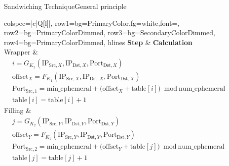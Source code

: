 \documentclass[aspectratio=169, hyperref={colorlinks=true, allcolors=SecondaryColor}, c]{beamer}
\begin{document}
	\begin{frame}[fragile]{Sandwiching Technique}{General principle}
		\begin{center}
			\begin{adjustbox}{max height=0.8\textheight, max width=0.8\textwidth}
				\begin{tblr}{
					colspec={|c|Q[l]|},
					row{1}={bg=PrimaryColor,fg=white,font=\bfseries},
					row{2}={bg=PrimaryColorDimmed},
					row{3}={bg=SecondaryColorDimmed},
					row{4}={bg=PrimaryColorDimmed},
					hlines
					}
					\textbf{Step} & \textbf{Calculation} \\

					Wrapper       &
					\(
					\begin{aligned}
						 & i = G_{K_2}(\text{IP}_{\text{Src},X}, \text{IP}_{\text{Dst},X}, \text{Port}_{\text{Dst},X})                                   \\
						 & \text{offset}_X = F_{K_1}(\text{IP}_{\text{Src},X}, \text{IP}_{\text{Dst},X}, \text{Port}_{\text{Dst},X})                     \\
						 & \text{Port}_{\text{Src},1} = \text{min\_ephemeral} + \bigl(\text{offset}_X + \text{table}[i]\bigr)\bmod \text{num\_ephemeral} \\
						 & \text{table}[i] = \text{table}[i] + 1
					\end{aligned}
					\)                                   \\

					Filling       &
					\(
					\begin{aligned}
						 & j = G_{K_2}(\text{IP}_{\text{Src},Y}, \text{IP}_{\text{Dst},Y}, \text{Port}_{\text{Dst},Y})                                   \\
						 & \text{offset}_Y = F_{K_1}(\text{IP}_{\text{Src},Y}, \text{IP}_{\text{Dst},Y}, \text{Port}_{\text{Dst},Y})                     \\
						 & \text{Port}_{\text{Src},2} = \text{min\_ephemeral} + \bigl(\text{offset}_Y + \text{table}[j]\bigr)\bmod \text{num\_ephemeral} \\
						 & \text{table}[j] = \text{table}[j] + 1
					\end{aligned}
					\)                                   \\


\end{tblr}
\end{adjustbox}
\end{center}
\end{frame}
\end{document}
